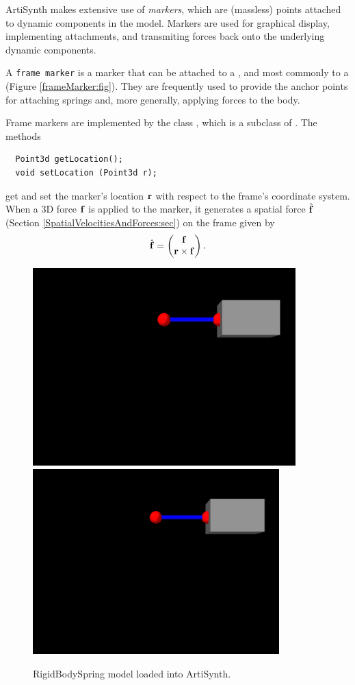 ArtiSynth makes extensive use of {\it markers}, which are (massless)
points attached to dynamic components in the model. Markers are used
for graphical display, implementing attachments, and transmiting
forces back onto the underlying dynamic components.

A {\tt frame marker} is a marker that can be attached to a
, and most commonly to a
 (Figure
\ref{frameMarker:fig}). They are frequently used to provide the
anchor points for attaching springs and, more generally, applying
forces to the body.

Frame markers are implemented by the class
, which
is a subclass of
.
The methods
%
\begin{lstlisting}
  Point3d getLocation();
  void setLocation (Point3d r);
\end{lstlisting}
%
get and set the marker's location ${\bf r}$ with respect to the frame's
coordinate system. When a 3D force ${\bf f}$ is applied to the marker, it
generates a spatial force $\hat{{\bf f}}$ (Section
\ref{SpatialVelocitiesAndForces:sec}) on the frame given by
%
\begin{equation}
\hat{{\bf f}} = \left(\begin{matrix} {\bf f} \\ {\bf r} \times {\bf f} \end{matrix}\right).
\end{equation}
%

\begin{figure}[h]
\begin{center}
\iflatexml
 \includegraphics[]{images/RigidBodySpring}
\else
 \includegraphics[width=3.75in]{images/RigidBodySpring}
\fi
\end{center}
\caption{RigidBodySpring model loaded into ArtiSynth.}
\label{RigidBodySpring:fig}
\end{figure}

